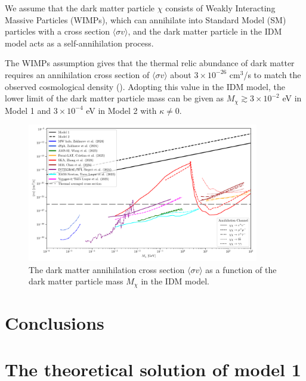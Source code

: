 \documentclass[twocolumn]{aastex631}
\begin{document}
   We assume that the dark matter particle $\chi$ consists of Weakly Interacting Massive Particles (WIMPs),
   which can annihilate into Standard Model (SM) particles with a cross section $\langle\sigma v\rangle$, 
   and the dark matter particle in the IDM model acts as a self-annihilation process.
   
   The WIMPs assumption gives that the thermal relic abundance of dark matter requires 
   an annihilation cross section of $\langle\sigma v \rangle $ about $ 3\times 10^{-26}$ cm${}^3$/s
   to match the observed cosmological density
   (\cite{PhysRevLett.39.165,annurev:/content/journals/10.1146/annurev.ns.29.120179.001525, GONDOLO1991145}).
   Adopting this value in the IDM model, the lower limit of the dark matter particle mass can be given as
   $M_{\chi} \gtrsim 3 \times 10^{-2}$ eV in Model 1 and 
   $3 \times 10^{-4}$ eV in Model 2 with $\kappa\neq0$.

   \begin{figure}
      \centering
      \includegraphics[width=0.9\textwidth]{dm_ann.pdf}
      \caption{The dark matter annihilation cross section $\langle\sigma v\rangle$ 
         as a function of the dark matter particle mass $M_{\chi}$ in the IDM model.
      }
      \label{fig:3}
   \end{figure}

\section{Conclusions}\label{sec:5}

\appendix

\section{The theoretical solution of model 1}
\end{document}
